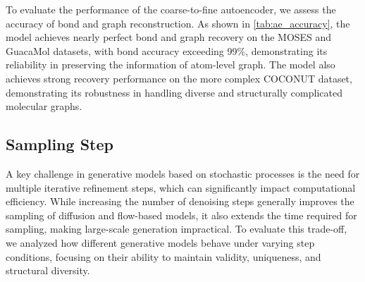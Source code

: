 

To evaluate the performance of the coarse-to-fine autoencoder, we assess the accuracy of bond and graph reconstruction. 
As shown in \cref{tab:ae_accuracy}, the model achieves nearly perfect bond and graph recovery on the MOSES and GuacaMol datasets, with bond accuracy exceeding 99\%, demonstrating its reliability in preserving the information of atom-level graph.  The model also achieves strong recovery performance on the more complex COCONUT dataset, demonstrating its robustness in handling diverse and structurally complicated molecular graphs.


\begin{comment}
\subsection{Other Fragmentization Method}
RBRICS MOSES.

\subsection{Effect of Sampling Techniques}
\label{appsubsec:effect_of_sampling_techniques}





We show the effect of target guidance ($\omega$) and stochasticity ($\eta$) in \cref{fig:target_guidance_effect,fig:noise_effect}. 
While increasing amount of target guidance, the tradeoff between     
\end{comment}


\subsection{Sampling  Step}
\label{appsubsec:sampling_step}



A key challenge in generative models based on stochastic processes is the need for multiple iterative refinement steps, which can significantly impact computational efficiency. 
While increasing the number of denoising steps generally improves the sampling of diffusion and flow-based models, it also extends the time required for sampling, making large-scale generation impractical. 
To evaluate this trade-off, we analyzed how different generative models behave under varying step conditions, focusing on their ability to maintain validity, uniqueness, and structural diversity. 

